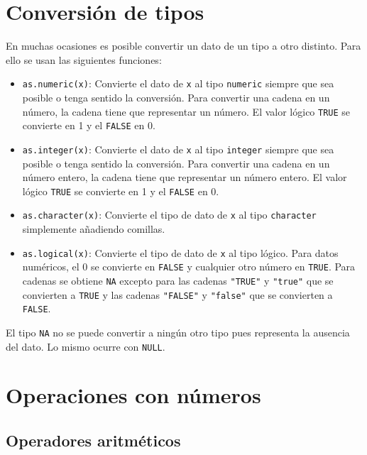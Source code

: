 \documentclass[
]{book}
\providecommand{\tightlist}{%
  \setlength{\itemsep}{0pt}\setlength{\parskip}{0pt}}
\theoremstyle{definition}
\theoremstyle{definition}
\theoremstyle{definition}
\theoremstyle{definition}
\theoremstyle{remark}
\begin{document}
\hypertarget{conversiuxf3n-de-tipos}{%
\section{Conversión de tipos}\label{conversiuxf3n-de-tipos}}

En muchas ocasiones es posible convertir un dato de un tipo a otro distinto. Para ello se usan las siguientes funciones:

\begin{itemize}
\tightlist
\item
  \texttt{as.numeric(x)}: Convierte el dato de \texttt{x} al tipo \texttt{numeric} siempre que sea posible o tenga sentido la conversión. Para convertir una cadena en un número, la cadena tiene que representar un número. El valor lógico \texttt{TRUE} se convierte en 1 y el \texttt{FALSE} en 0.
\item
  \texttt{as.integer(x)}: Convierte el dato de \texttt{x} al tipo \texttt{integer} siempre que sea posible o tenga sentido la conversión. Para convertir una cadena en un número entero, la cadena tiene que representar un número entero. El valor lógico \texttt{TRUE} se convierte en 1 y el \texttt{FALSE} en 0.
\item
  \texttt{as.character(x)}: Convierte el tipo de dato de \texttt{x} al tipo \texttt{character} simplemente añadiendo comillas.
\item
  \texttt{as.logical(x)}: Convierte el tipo de dato de \texttt{x} al tipo lógico. Para datos numéricos, el 0 se convierte en \texttt{FALSE} y cualquier otro número en \texttt{TRUE}. Para cadenas se obtiene \texttt{NA} excepto para las cadenas \texttt{"TRUE"} y \texttt{"true"} que se convierten a \texttt{TRUE} y las cadenas \texttt{"FALSE"} y \texttt{"false"} que se convierten a \texttt{FALSE}.
\end{itemize}

El tipo \texttt{NA} no se puede convertir a ningún otro tipo pues representa la ausencia del dato. Lo mismo ocurre con \texttt{NULL}.

\hypertarget{operaciones-con-nuxfameros}{%
\section{Operaciones con números}\label{operaciones-con-nuxfameros}}

\hypertarget{operadores-aritmuxe9ticos}{%
\subsection{Operadores aritméticos}\label{operadores-aritmuxe9ticos}}
\end{document}
